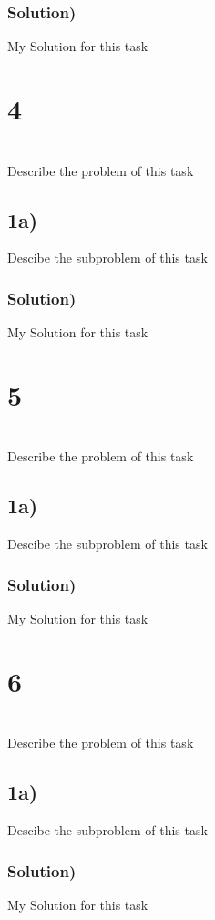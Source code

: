\documentclass[oneside]{article}
\begin{document}
\subsubsection*{Solution)}
My Solution for this task

\pagebreak

\section*{4}
\\
Describe the problem of this task

\subsection*{1a)}
Descibe the subproblem of this task

\subsubsection*{Solution)}
My Solution for this task

\pagebreak

\section*{5}
\\
Describe the problem of this task

\subsection*{1a)}
Descibe the subproblem of this task

\subsubsection*{Solution)}
My Solution for this task

\pagebreak

\section*{6}
\\
Describe the problem of this task

\subsection*{1a)}
Descibe the subproblem of this task

\subsubsection*{Solution)}
My Solution for this task

\pagebreak
\end{document}
